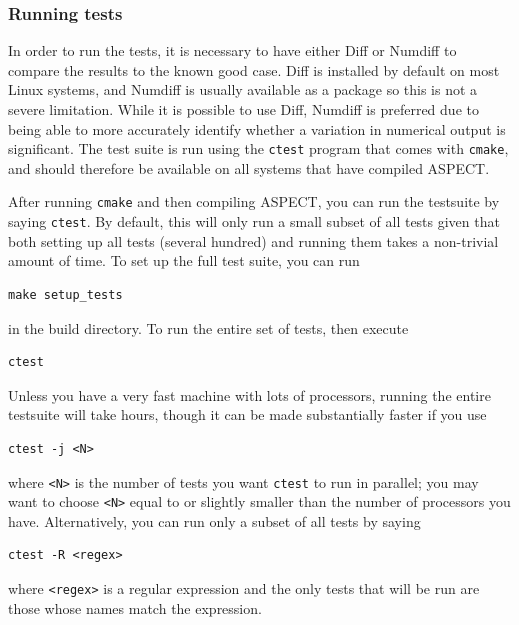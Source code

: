 \documentclass{article}
\newcommand{\aspect}{\textsc{ASPECT}}
\begin{document}
\subsubsection{Running tests}
\label{sec:running_tests}

In order to run the tests, it is necessary to have either Diff or Numdiff to
compare the results to the known good case.
Diff is installed by default on most Linux systems, and Numdiff is usually
available as a package so this is not a severe limitation.
While it is possible to use Diff, Numdiff is preferred due to being able to
more accurately identify whether a variation in numerical output is
significant.
The test suite is run using the \texttt{ctest} program that comes with
\texttt{cmake}, and should therefore be available on all systems that have
compiled \aspect{}.

After running \texttt{cmake} and then compiling \aspect{}, you can run the
testsuite by saying \texttt{ctest}. By default, this will only run a small
subset of all tests given that both setting up all tests (several hundred) and
running them takes a non-trivial amount of time. To set up the full test suite,
you can run
\begin{lstlisting}[frame=single,language=ksh]
    make setup_tests
\end{lstlisting}
 in the build directory. To run the entire set of tests, then execute
\begin{lstlisting}[frame=single,language=ksh]
    ctest
\end{lstlisting}
Unless you have a very fast machine with lots of processors, running the entire
testsuite will take hours, though it can be made substantially faster if you use
\begin{lstlisting}[frame=single,language=ksh]
    ctest -j <N>
\end{lstlisting}
where \texttt{<N>} is the number of tests you want \texttt{ctest} to run
in parallel; you may want to choose \texttt{<N>} equal to or slightly smaller
than the number of processors you have. Alternatively, you can run only a subset
of all tests by saying 
\begin{lstlisting}[frame=single,language=ksh] 
    ctest -R <regex>
\end{lstlisting}
where \texttt{<regex>} is a regular expression and the only tests that will be
run are those whose names match the expression.
\end{document}
